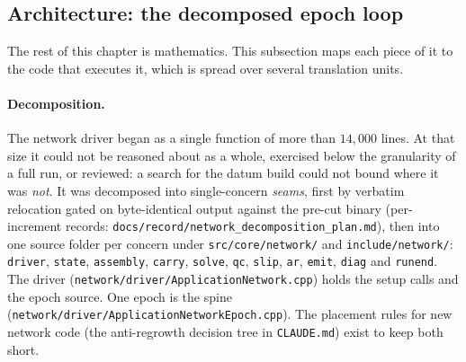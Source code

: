 \documentclass[main.tex]{subfiles}
\begin{document}
\subsection{Architecture: the decomposed epoch loop}
\label{sec:net-arch}

The rest of this chapter is mathematics. This subsection maps each
piece of it to the code that executes it, which is spread over several
translation units.

\paragraph{Decomposition.}
The network driver began as a single function of more than $14{,}000$
lines. At that size it could not be reasoned about as a whole,
exercised below the granularity of a full run, or reviewed: a search
for the datum build could not bound where it was \emph{not}. It was
decomposed into single-concern \emph{seams}, first by verbatim
relocation gated on byte-identical output against the pre-cut binary
(per-increment records:
\texttt{docs/record/network\_decomposition\_plan.md}), then into one source
folder per concern under \texttt{src/core/network/} and
\texttt{include/network/}: \texttt{driver}, \texttt{state},
\texttt{assembly}, \texttt{carry}, \texttt{solve}, \texttt{qc},
\texttt{slip}, \texttt{ar}, \texttt{emit}, \texttt{diag} and
\texttt{runend}. The driver
(\texttt{network/driver/ApplicationNetwork.cpp}) holds the setup calls
and the epoch source. One epoch is the spine
(\texttt{network/driver/ApplicationNetworkEpoch.cpp}). The placement rules
for new network code (the anti-regrowth decision tree in
\texttt{CLAUDE.md}) exist to keep both short.
\end{document}
